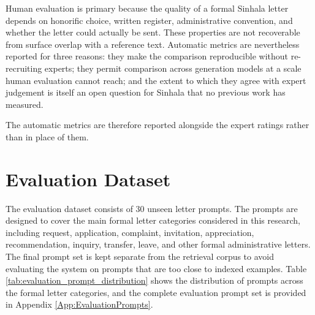 \documentclass[12pt]{uomthesis}
\begin{document}
Human evaluation is primary because the quality of a formal Sinhala letter depends on honorific choice, written register, administrative convention, and whether the letter could actually be sent. These properties are not recoverable from surface overlap with a reference text. Automatic metrics are nevertheless reported for three reasons: they make the comparison reproducible without re-recruiting experts; they permit comparison across generation models at a scale human evaluation cannot reach; and the extent to which they agree with expert judgement is itself an open question for Sinhala that no previous work has measured.

The automatic metrics are therefore reported alongside the expert ratings rather than in place of them.

\section{Evaluation Dataset}

The evaluation dataset consists of 30 unseen letter prompts. The prompts are designed to cover the main formal letter categories considered in this research, including request, application, complaint, invitation, appreciation, recommendation, inquiry, transfer, leave, and other formal administrative letters. The final prompt set is kept separate from the retrieval corpus to avoid evaluating the system on prompts that are too close to indexed examples. Table \ref{tab:evaluation_prompt_distribution} shows the distribution of prompts across the formal letter categories, and the complete evaluation prompt set is provided in Appendix \ref{App:EvaluationPrompts}.
\end{document}
